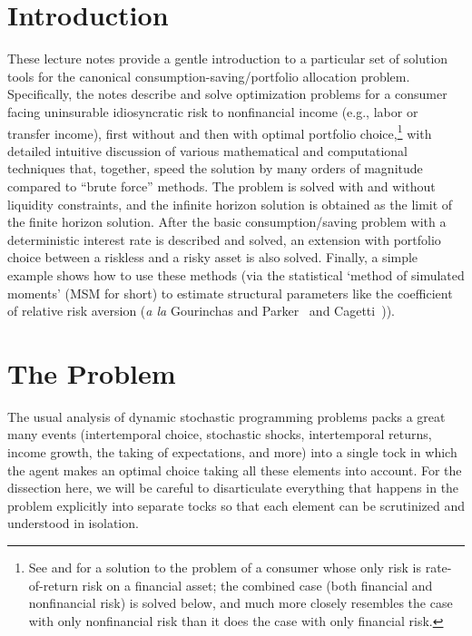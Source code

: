 \documentclass[titlepage, headings=optiontotocandhead]{Resources/texmf-local/tex/latex/econtex}
\begin{document}
%
\hypertarget{introduction}{}
\section{Introduction}\label{sec:introduction}

  These lecture notes provide a gentle introduction to a particular set of solution tools for the canonical consumption-saving/portfolio allocation problem.  Specifically, the notes describe and solve optimization problems for a consumer facing uninsurable idiosyncratic risk to nonfinancial income (e.g., labor or transfer income), first without and then with optimal portfolio choice,\footnote{See \cite{merton:restat} and \cite{samuelson:portfolio} for a solution to the problem of a consumer whose only risk is rate-of-return risk on a financial asset; the combined case (both financial and nonfinancial risk) is solved below, and much more closely resembles the case with only nonfinancial risk than it does the case with only financial risk.} with detailed intuitive discussion of various mathematical and computational techniques that, together, speed the solution by many orders of magnitude compared to ``brute force'' methods.  The problem is solved with and without liquidity constraints, and the infinite horizon solution is obtained as the limit of the finite horizon solution.  After the basic consumption/saving problem with a deterministic interest rate is described and solved, an extension with portfolio choice between a riskless and a risky asset is also solved.  Finally, a simple example shows how to use these methods (via the statistical `method of simulated moments' (MSM for short) to estimate structural parameters like the coefficient of relative risk aversion (\textit{a la} Gourinchas and Parker~\citeyearpar{gpLifecycle} and Cagetti~\citeyearpar{cagettiWprofiles})).


\hypertarget{the-problem}{}
\section{The Problem}\label{sec:the-problem}

The usual analysis of dynamic stochastic programming problems packs a great many events (intertemporal choice, stochastic shocks, intertemporal returns, income growth, the taking of expectations, and more) into a single {tock} in which the agent makes an optimal choice taking all these elements into account. For the dissection here, we will be careful to disarticulate everything that happens in the problem explicitly into separate {tocks} so that each element can be scrutinized and understood in isolation.
\end{document}

